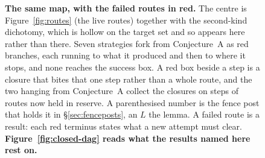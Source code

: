 \begin{figure}
{%
}
\caption{\textbf{The same map, with the failed routes in red.} The centre is Figure~\ref{fig:routes} (the live routes) together with the second-kind dichotomy, which is hollow on the target set and so appears here rather than there. Seven strategies fork from Conjecture~A as red branches, each running to what it produced and then to where it stops, and none reaches the success box. A red box beside a step is a closure that bites that one step rather than a whole route, and the two hanging from Conjecture~A collect the closures on steps of routes now held in reserve. A parenthesised number is the fence post that holds it in \S\ref{sec:fenceposts}, an $L$ the lemma. A failed route is a result: each red terminus states what a new attempt must clear. \textbf{Figure~\ref{fig:closed-dag} reads what the results named here rest on.}}
\label{fig:closed}
\end{figure}
